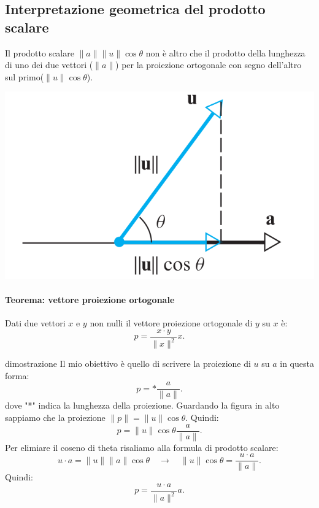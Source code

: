 \documentclass[x11names]{article}
\begin{document}
\subsection{Interpretazione geometrica del prodotto scalare}
Il prodotto scalare $\|a\|\|u\|\cos{\theta}$ non è altro che il prodotto della lunghezza di uno dei due vettori ($\|a\|$) per la proiezione ortogonale con segno dell'altro sul primo($\|u\|\cos{\theta}$).

\begin{center}
\includegraphics[scale=0.25]{figures/proj.png}
\end{center}


\begin{center}
\colorbox{Bisque1}{\begin{minipage}{5.75in}
\begin{yes}{}
\paragraph{Teorema: vettore proiezione ortogonale}
Dati due vettori $x$ e $y$ non nulli il vettore proiezione ortogonale di $y$ su $x$ è:
\[
p = \frac{x\cdot y}{\|x\|^2}x
.\] 
\end{yes}
\end{minipage}}        
\end{center}

\begin{es}{dimostrazione}
Il mio obiettivo è quello di scrivere la proiezione di $u$ su $a$ in questa forma:
\[
p = * \frac{a}{\|a\|}
.\] 
dove "*" indica la lunghezza della proiezione.
Guardando la figura in alto sappiamo che la proiezione $\|p\| = \|u\|\cos{\theta}$. Quindi:
\[
p = \|u\|\cos{\theta} \frac{a}{\|a\|} 
.\] 
Per elimiare il coseno di theta risaliamo alla formula di prodotto scalare:
\[
u \cdot a = \|u\|\|a\|\cos{\theta} \quad \longrightarrow \quad \|u\|\cos{\theta} = \frac{u\cdot a}{\|a\|}
.\] 
Quindi:
\[
p = \frac{u\cdot a}{\|a\|^2}a
.\] 
\end{es}
\end{document}
